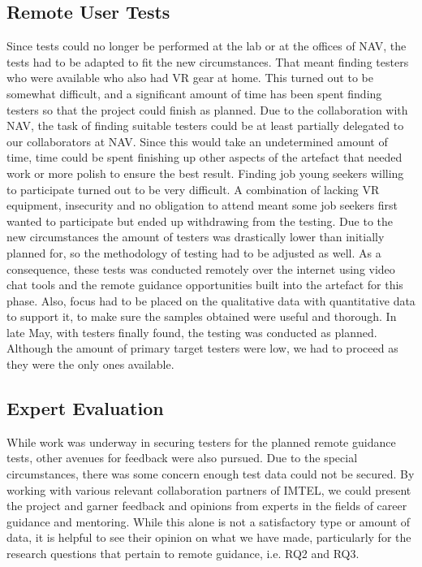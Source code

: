 \subsection{Remote User Tests}
Since tests could no longer be performed at the lab or at the offices of NAV, the tests had to be adapted to fit the new circumstances. That meant finding testers who were available who also had VR gear at home. This turned out to be somewhat difficult, and a significant amount of time has been spent finding testers so that the project could finish as planned. Due to the collaboration with NAV, the task of finding suitable testers could be at least partially delegated to our collaborators at NAV. Since this would take an undetermined amount of time, time could be spent finishing up other aspects of the artefact that needed work or more polish to ensure the best result.
Finding job young seekers willing to participate turned out to be very difficult. A combination of lacking VR equipment, insecurity and no obligation to attend meant some job seekers first wanted to participate but ended up withdrawing from the testing. Due to the new circumstances the amount of testers was drastically lower than initially planned for, so the methodology of testing had to be adjusted as well. As a consequence, these tests was conducted remotely over the internet using video chat tools and the remote guidance opportunities built into the artefact for this phase. Also, focus had to be placed on the qualitative data with quantitative data to support it, to make sure the samples obtained were useful and thorough. In late May, with testers finally found, the testing was conducted as planned. Although the amount of primary target testers were low, we had to proceed as they were the only ones available.   



\subsection{Expert Evaluation}
\label{section:phase3_expertEval}
While work was underway in securing testers for the planned remote guidance tests, other avenues for feedback were also pursued. Due to the special circumstances, there was some concern enough test data could not be secured. By working with various relevant collaboration partners of IMTEL, we could present the project and garner feedback and opinions from experts in the fields of career guidance and mentoring. While this alone is not a satisfactory type or amount of data, it is helpful to see their opinion on what we have made, particularly for the research questions that pertain to remote guidance, i.e. RQ2 and RQ3.

